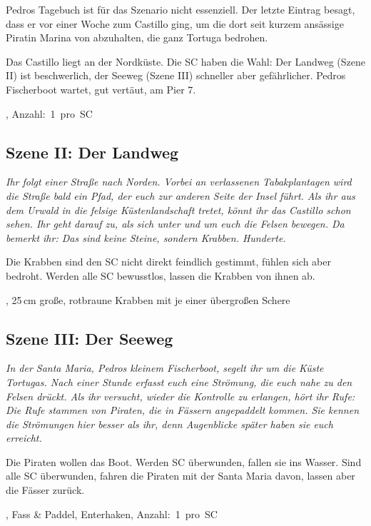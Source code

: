 {		Pedros Tagebuch ist für das Szenario nicht essenziell. Der letzte Eintrag besagt, dass er vor einer Woche zum Castillo ging, um die dort seit kurzem ansässige Piratin Marina von  abzuhalten, die ganz Tortuga bedrohen.

		Das Castillo liegt an der Nordküste. Die SC haben die Wahl: Der Landweg (Szene II) ist beschwerlich, der Seeweg (Szene III) schneller aber gefährlicher. Pedros Fischerboot wartet, gut vertäut, am Pier 7.

		, Anzahl:~1~pro~SC

		\subsection{Szene II: Der Landweg}

		\emph{Ihr folgt einer Straße nach Norden. Vorbei an verlassenen Tabakplantagen wird die Straße bald ein Pfad, der euch zur anderen Seite der Insel führt. Als ihr aus dem Urwald in die felsige Küstenlandschaft tretet, könnt ihr das Castillo schon sehen. Ihr geht darauf zu, als sich unter und um euch die Felsen bewegen. Da bemerkt ihr: Das sind keine Steine, sondern Krabben. Hunderte.}

		Die Krabben sind den SC nicht direkt feindlich gestimmt, fühlen sich aber bedroht. Werden alle SC bewusstlos, lassen die Krabben von ihnen ab.

		, 25\,cm große, rotbraune Krabben mit je einer übergroßen Schere

		\subsection{Szene III: Der Seeweg}

		\noindent
		\emph{In der Santa Maria, Pedros kleinem Fischerboot, segelt ihr um die Küste Tortugas. Nach einer Stunde erfasst euch eine Strömung, die euch nahe zu den Felsen drückt. Als ihr versucht, wieder die Kontrolle zu erlangen, hört ihr Rufe:  Die Rufe stammen von Piraten, die in Fässern angepaddelt kommen. Sie kennen die Strömungen hier besser als ihr, denn Augenblicke später haben sie euch erreicht.}

		Die Piraten wollen das Boot. Werden SC überwunden, fallen sie ins Wasser. Sind alle SC überwunden, fahren die Piraten mit der Santa Maria davon, lassen aber die Fässer zurück.

		, Fass \& Paddel, Enterhaken, Anzahl:~1~pro~SC

}
